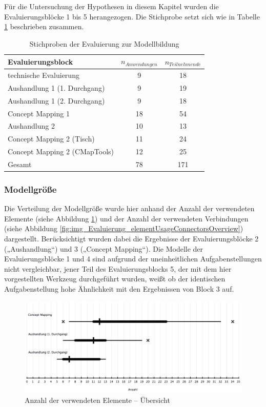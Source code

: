 Für die Untersuchung der Hypothesen in diesem Kapitel wurden die Evaluierungsblöcke 1 bis 5 herangezogen. Die Stichprobe setzt sich wie in Tabelle \ref{tab:stichprobe_modell} beschrieben zusammen.

\begin{table}[htbp]
	\centering
	\caption{Stichproben der Evaluierung zur Modellbildung}

	\begin{tabular}{| l || c | c |}
	\hline
		Evaluierungsblock & $n_{Anwendungen}$ & $n_{Teilnehmende}$ \\ \hline
		technische Evaluierung		  &  9 & 18 \\
		Aushandlung 1 (1. Durchgang)  &  9 & 19 \\
		Aushandlung 1 (2. Durchgang)  &  9 & 18 \\
		Concept Mapping 1			  & 18 & 54 \\
		Aushandlung 2				  & 10 & 13 \\
		Concept Mapping 2 (Tisch)     & 11 & 24 \\
		Concept Mapping 2 (CMapTools) & 12 & 25 \\ \hline
		Gesamt						  & 78 & 171 \\ \hline
\end{tabular}
	\label{tab:stichprobe_modell}
\end{table}

\subsubsection{Modellgröße} %
\label{ssub:modellgröße}

Die Verteilung der Modellgröße wurde hier anhand der Anzahl der verwendeten Elemente (siehe Abbildung \ref{fig:img_Evaluierung_elementUsageBlocksOverview}) und der Anzahl der verwendeten Verbindungen (siehe Abbildung \ref{fig:img_Evaluierung_elementUsageConnectorsOverview}) dargestellt. Berücksichtigt wurden dabei die Ergebnisse der Evaluierungsblöcke 2 („Aushandlung“) und 3 („Concept Mapping“). Die Modelle der Evaluierungsblöcke 1 und 4 sind aufgrund der uneinheitlichen Aufgabenstellungen nicht vergleichbar, jener Teil des Evaluierungsblocks 5, der mit dem hier vorgestellten Werkzeug durchgeführt wurden, weißt ob der identischen Aufgabenstellung hohe Ähnlichkeit mit den Ergebnissen von Block 3 auf.

\begin{figure}[htbp]
	\centering
		\includegraphics[width=15cm]{img/Evaluierung/elementUsageBlocksOverview.png}
	\caption{Anzahl der verwendeten Elemente -- Übersicht}
	\label{fig:img_Evaluierung_elementUsageBlocksOverview}
\end{figure}

